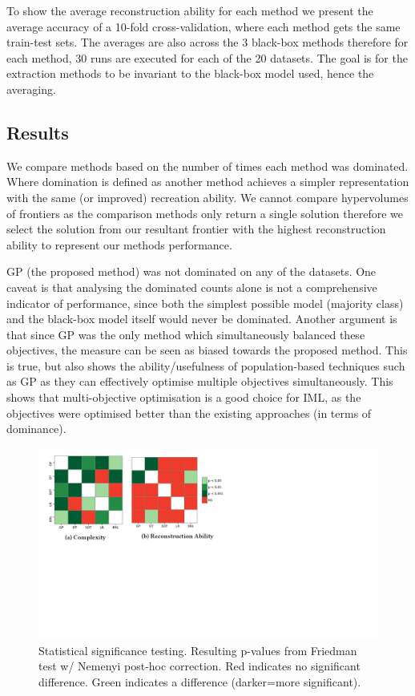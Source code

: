 To show the average reconstruction ability for each method we present the average accuracy of a 10-fold cross-validation, where each method gets the same train-test sets. The averages are also across the 3 black-box methods therefore for each method, 30 runs are executed for each of the 20 datasets. The goal is for the extraction methods to be invariant to the black-box model used, hence the averaging.
\subsection{Results}
We compare methods based on the number of times each method was dominated. Where domination is defined as another method achieves a simpler representation with the same (or improved) recreation ability. We cannot compare hypervolumes of frontiers as the comparison methods only return a single solution therefore we select the solution from our resultant frontier with the highest reconstruction ability to represent our methods performance.

GP (the proposed method) was not dominated on any of the datasets. One caveat is that analysing the dominated counts alone is not a comprehensive indicator of performance, since both the simplest possible model (majority class) and the black-box model itself would never be dominated. Another argument is that since GP was the only method which simultaneously balanced these objectives, the measure can be seen as biased towards the proposed method. This is true, but also shows the ability/usefulness of population-based techniques such as GP as they can effectively optimise multiple objectives simultaneously. This shows that multi-objective optimisation is a good choice for IML, as the objectives were optimised better than the existing approaches (in terms of dominance).
\begin{center}
\begin{figure}[h]
\includegraphics{result_analysis_resized}
\caption{Statistical significance testing. Resulting p-values
from Friedman test w/ Nemenyi post-hoc correction. Red
indicates no significant difference. Green indicates a difference
(darker=more significant).}
\end{figure}
\end{center}

